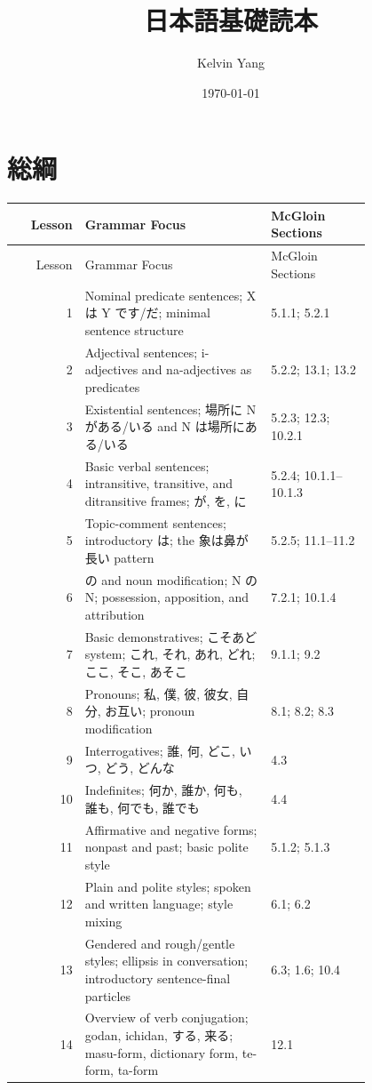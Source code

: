 \documentclass[12pt]{nextbook_zh}
\title{日本語基礎読本}
\author{Kelvin Yang}
\date{\today}
\begin{document}
\frontmatter
\maketitle
\chapter*{総綱}
{\small
\begin{longtable}{r p{0.52\linewidth} p{0.28\linewidth}}
\toprule
Lesson & Grammar Focus & McGloin Sections \\
\midrule
\endfirsthead

\toprule
Lesson & Grammar Focus & McGloin Sections \\
\midrule
\endhead

\bottomrule
\endfoot

1 & Nominal predicate sentences; X は Y です/だ; minimal sentence structure & 5.1.1; 5.2.1 \\
2 & Adjectival sentences; i-adjectives and na-adjectives as predicates & 5.2.2; 13.1; 13.2 \\
3 & Existential sentences; 場所に N がある/いる and N は場所にある/いる & 5.2.3; 12.3; 10.2.1 \\
4 & Basic verbal sentences; intransitive, transitive, and ditransitive frames; が, を, に & 5.2.4; 10.1.1--10.1.3 \\
5 & Topic-comment sentences; introductory は; the 象は鼻が長い pattern & 5.2.5; 11.1--11.2 \\
6 & の and noun modification; N の N; possession, apposition, and attribution & 7.2.1; 10.1.4 \\
7 & Basic demonstratives; こそあど system; これ, それ, あれ, どれ; ここ, そこ, あそこ & 9.1.1; 9.2 \\
8 & Pronouns; 私, 僕, 彼, 彼女, 自分, お互い; pronoun modification & 8.1; 8.2; 8.3 \\
9 & Interrogatives; 誰, 何, どこ, いつ, どう, どんな & 4.3 \\
10 & Indefinites; 何か, 誰か, 何も, 誰も, 何でも, 誰でも & 4.4 \\
11 & Affirmative and negative forms; nonpast and past; basic polite style & 5.1.2; 5.1.3 \\
12 & Plain and polite styles; spoken and written language; style mixing & 6.1; 6.2 \\
13 & Gendered and rough/gentle styles; ellipsis in conversation; introductory sentence-final particles & 6.3; 1.6; 10.4 \\
14 & Overview of verb conjugation; godan, ichidan, する, 来る; masu-form, dictionary form, te-form, ta-form & 12.1 \\

\end{longtable}}
\end{document}
